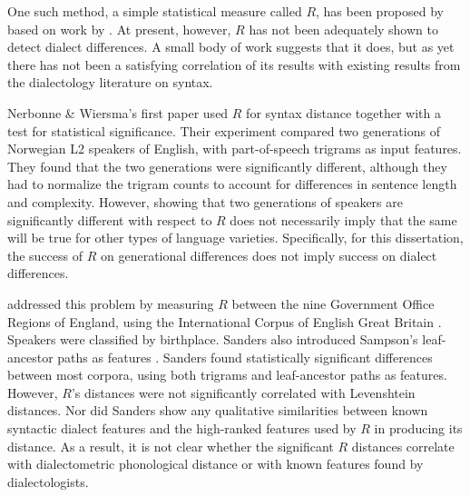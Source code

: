 One such method, a simple statistical measure called $R$, has been
proposed by  based on work by
. At present, however, $R$ has not been adequately
shown to detect dialect differences. A small body of work suggests
that it does, but as yet there has not been a satisfying correlation
of its results with existing results from the dialectology literature
on syntax.

Nerbonne \& Wiersma's first paper used $R$ for syntax distance
together with a test for statistical significance\cite{nerbonne06}.
Their experiment compared two generations of
Norwegian L2 speakers of English, with part-of-speech trigrams as input features.
They found that the two generations were significantly
different, although they had to normalize the trigram counts to
account for differences in sentence length and complexity. However,
showing that two generations of speakers are significantly different with respect
to $R$ does not necessarily imply that the same will be true for other
types of language varieties. Specifically, for this dissertation, the
success of $R$ on generational differences does not imply success on
dialect differences.

 addressed this problem by measuring $R$ between
the nine Government Office Regions of England, using the International
Corpus of English Great Britain \cite{nelson02}. Speakers were classified by
birthplace. Sanders also introduced Sampson's leaf-ancestor paths as
features \cite{sampson00}. Sanders found statistically
significant differences between most corpora, using both trigrams and
leaf-ancestor paths as features. However, $R$'s distances were not
significantly correlated with Levenshtein distances. Nor did Sanders
show any qualitative similarities between known syntactic dialect
features and the high-ranked features used by $R$ in producing its
distance. As a result, it is not clear whether the significant $R$ distances
correlate with dialectometric phonological distance or with known
features found by dialectologists.



